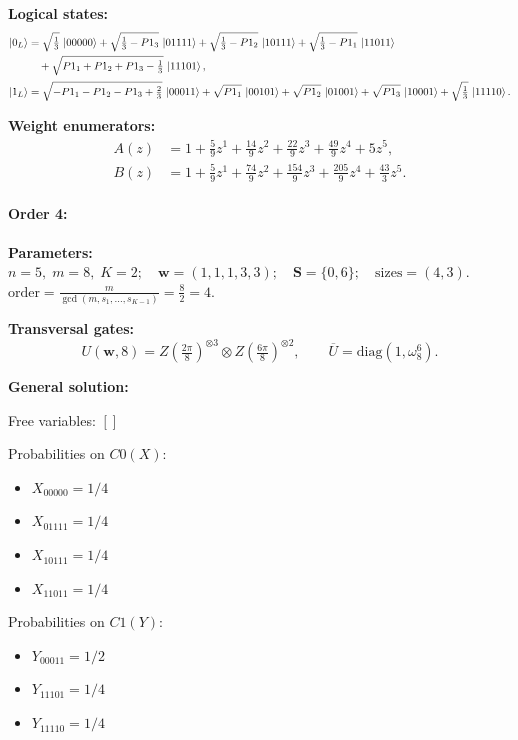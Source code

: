 \documentclass[11pt]{article}
\begin{document}
\noindent\textbf{Logical states:}
\begin{align*}
\ket{0_L} &= \sqrt{\tfrac{1}{3}}\,\ket{00000} + \sqrt{\tfrac{1}{3} - P1_3}\,\ket{01111} + \sqrt{\tfrac{1}{3} - P1_2}\,\ket{10111} + \sqrt{\tfrac{1}{3} - P1_1}\,\ket{11011}\\
&\quad + \sqrt{P1_1 + P1_2 + P1_3 - \tfrac{1}{3}}\,\ket{11101},
\\[2pt]
\ket{1_L} &= \sqrt{-P1_1 - P1_2 - P1_3 + \tfrac{2}{3}}\,\ket{00011} + \sqrt{P1_1}\,\ket{00101} + \sqrt{P1_2}\,\ket{01001} + \sqrt{P1_3}\,\ket{10001} + \sqrt{\tfrac{1}{3}}\,\ket{11110}.
\end{align*}

\noindent\textbf{Weight enumerators:}
\begin{align*}
A(z) &= 1 + \tfrac{5}{9}z^{1} + \tfrac{14}{9}z^{2} + \tfrac{22}{9}z^{3} + \tfrac{49}{9}z^{4} + 5z^{5},\\[2pt]
B(z) &= 1 + \tfrac{5}{9}z^{1} + \tfrac{74}{9}z^{2} + \tfrac{154}{9}z^{3} + \tfrac{205}{9}z^{4} + \tfrac{43}{3}z^{5}.
\end{align*}

\paragraph{\textbf{Order 4:}}
\noindent\textbf{Parameters:} $n=5,\; m=8,\; K=2;\quad \mathbf w=(1, 1, 1, 3, 3);\quad \mathbf S=\{0, 6\};\quad \text{sizes}=\left(4, 3\right).$ $\displaystyle \text{order}=\frac{m}{\gcd(m,s_1,\dots,s_{K-1})}=\frac{8}{2}=4.$

\noindent\textbf{Transversal gates:}
\[
    U(\mathbf w,8)=Z \left(\tfrac{2\pi}{8}\right)^{\otimes3} \otimes Z \left(\tfrac{6\pi}{8}\right)^{\otimes2},\qquad
    \overline U=\mathrm{diag}(1,\omega_8^{6}).
\]

\noindent\textbf{General solution:}

Free variables: $[]$

Probabilities on $C0 (X)$:
\begin{itemize}
    \item $X_{00000} = 1/4$
    \item $X_{01111} = 1/4$
    \item $X_{10111} = 1/4$
    \item $X_{11011} = 1/4$
\end{itemize}

Probabilities on $C1 (Y)$:
\begin{itemize}
    \item $Y_{00011} = 1/2$
    \item $Y_{11101} = 1/4$
    \item $Y_{11110} = 1/4$
\end{itemize}
\end{document}
